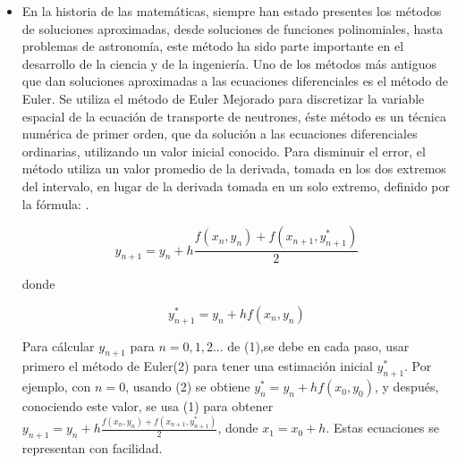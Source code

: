 \documentclass[12 pt,letterpaper]{article}
\begin{document}
	\begin{itemize}
 \item\justify 
    En la historia de las matemáticas, siempre han estado presentes los métodos de soluciones aproximadas, desde soluciones de funciones polinomiales, hasta problemas de astronomía, este método  ha sido parte importante en el desarrollo de la ciencia y de la ingeniería. Uno de los métodos más antiguos que dan soluciones aproximadas a las ecuaciones diferenciales es el método de Euler.
    Se utiliza el método de Euler Mejorado para discretizar la variable espacial de la ecuación de transporte de neutrones, éste método es un técnica numérica de primer orden, que da solución a las ecuaciones diferenciales ordinarias, utilizando un valor inicial conocido. Para disminuir el error, el método utiliza un valor promedio de la derivada, tomada en los dos extremos del intervalo, en lugar de la derivada tomada en un solo extremo, definido por la fórmula:
.
    

	\begin{equation}
   y_{n+1}=y_{n}+h\frac{f(x_{n},y_{n})+f(x_{n+1},y^*_{n+1})}{2}
    \end{equation}

donde

 
	\begin{equation}
   y^*_{n+1}=y_{n}+hf(x_{n},y_{n})
    \end{equation}\vspace{0.3Cm}

Para cálcular $y_{n+1}$ para $n=0,1,2...$ de (1),se debe en cada paso, usar primero el método de Euler(2) para tener una estimación inicial $y^*_{n+1}$. Por ejemplo, con $n=0$, usando (2) se obtiene  $y^*_{n}= y_{n}+hf(x_{0},y_{0})$, y después, conociendo este valor, se usa (1) para obtener  $y_{n+1}=y_{n}+h\frac{f(x_{n},y_{n})+f(x_{n+1},y^*_{n+1})}{2}$, donde $x_{1}=x_{0}+h$. Estas ecuaciones se representan con facilidad.


\end{itemize}
\end{document}
